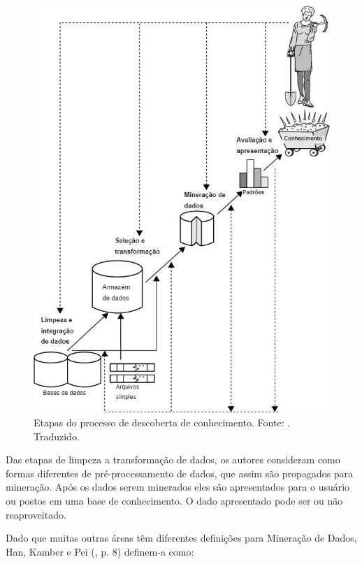 \begin{figure}[H]
    \centering
    \includegraphics[scale=0.45]{figuras/referencial_teorico/etapas_ml.png}
    \caption[Etapas do processo de descoberta de conhecimento]{Etapas do processo de descoberta de conhecimento. Fonte: \cite{Han:2011:DMC:1972541}. Traduzido.}
    \label{fig:etapas_ml}
\end{figure}

Das etapas de limpeza a transformação de dados, os autores consideram como formas diferentes de pré-processamento de dados, que assim são propagados para mineração. Após os dados serem minerados eles são apresentados para o usuário ou postos em uma base de conhecimento. O dado apresentado pode ser ou não reaproveitado.

Dado que muitas outras áreas têm diferentes definições para Mineração de Dados, Han, Kamber e Pei (\citeyear{Han:2011:DMC:1972541}, p. 8) definem-a como:

